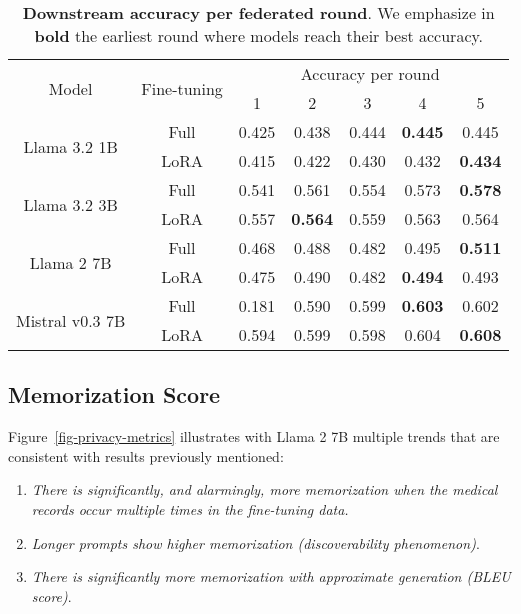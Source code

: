 \begin{table}[ht]
\caption{\textbf{Downstream accuracy per federated round}. We emphasize in \textbf{bold} the earliest round where models reach their best accuracy.}
\label{tab:fl-acc-round}
\vskip 0.15in
\begin{center}
\begin{tabular}{@{}cc|ccccc@{}}
\toprule
\multirow{2}{*}{Model}           & \multirow{2}{*}{Fine-tuning} & \multicolumn{5}{c}{Accuracy per round}            \\
                                 &                              & 1     & 2     & 3     & 4     & 5     \\ \midrule
\multirow{2}{*}{Llama 3.2 1B}    & Full                         & 0.425 & 0.438 & 0.444 & \textbf{0.445} & 0.445 \\
                                 & LoRA                         & 0.415 & 0.422 & 0.430 & 0.432 & \textbf{0.434} \\\midrule
\multirow{2}{*}{Llama 3.2 3B}    & Full                         & 0.541 & 0.561 & 0.554 & 0.573 & \textbf{0.578} \\
                                 & LoRA                         & 0.557 & \textbf{0.564} & 0.559 & 0.563 & 0.564 \\\midrule
\multirow{2}{*}{Llama 2 7B}      & Full                         & 0.468 & 0.488 & 0.482 & 0.495 & \textbf{0.511} \\
                                 & LoRA                         & 0.475 & 0.490 & 0.482 & \textbf{0.494} & 0.493 \\\midrule
\multirow{2}{*}{Mistral v0.3 7B} & Full                         & 0.181 & 0.590 & 0.599 & \textbf{0.603} & 0.602 \\
                                 & LoRA                         & 0.594 & 0.599 & 0.598 & 0.604 & \textbf{0.608} \\ \bottomrule
\end{tabular}
\end{center}
\vskip -0.1in
\end{table}

\subsection{Memorization Score}
\label{sec:mem_score}
Figure~\ref{fig-privacy-metrics} illustrates with Llama 2 7B multiple trends that are consistent with results previously mentioned: 
\begin{enumerate}
    \item \textit{There is significantly, and alarmingly, more memorization when the medical records occur multiple times in the fine-tuning data.} 
    \item \textit{Longer prompts show higher memorization (discoverability phenomenon)}. 
    \item \textit{There is significantly more memorization with approximate generation (BLEU score)}.
\end{enumerate}

